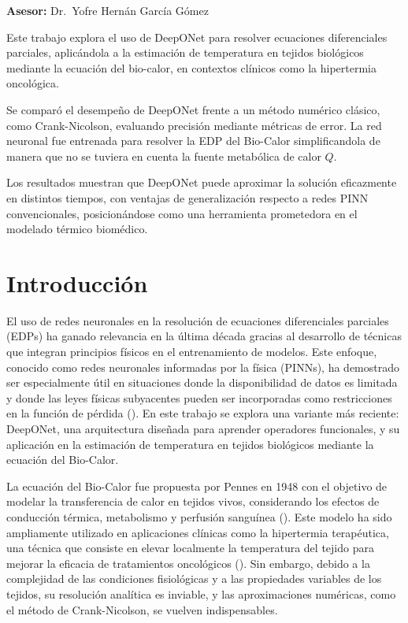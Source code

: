 \documentclass[
  spanish,
  us-letterpaper,
]{scrreprt}
\theoremstyle{plain}
\theoremstyle{definition}
\theoremstyle{remark}
\begin{document}
\textbf{Asesor:} Dr.~Yofre Hernán García Gómez

Este trabajo explora el uso de DeepONet para resolver ecuaciones
diferenciales parciales, aplicándola a la estimación de temperatura en
tejidos biológicos mediante la ecuación del bio-calor, en contextos
clínicos como la hipertermia oncológica.

Se comparó el desempeño de DeepONet frente a un método numérico clásico,
como Crank-Nicolson, evaluando precisión mediante métricas de error. La
red neuronal fue entrenada para resolver la EDP del Bio-Calor
simplificandola de manera que no se tuviera en cuenta la fuente
metabólica de calor \(Q\).

Los resultados muestran que DeepONet puede aproximar la solución
eficazmente en distintos tiempos, con ventajas de generalización
respecto a redes PINN convencionales, posicionándose como una
herramienta prometedora en el modelado térmico biomédico.


\chapter{Introducción}\label{introducciuxf3n}

El uso de redes neuronales en la resolución de ecuaciones diferenciales
parciales (EDPs) ha ganado relevancia en la última década gracias al
desarrollo de técnicas que integran principios físicos en el
entrenamiento de modelos. Este enfoque, conocido como redes neuronales
informadas por la física (PINNs), ha demostrado ser especialmente útil
en situaciones donde la disponibilidad de datos es limitada y donde las
leyes físicas subyacentes pueden ser incorporadas como restricciones en
la función de pérdida (). En este trabajo se explora una variante más
reciente: DeepONet, una arquitectura diseñada para aprender operadores
funcionales, y su aplicación en la estimación de temperatura en tejidos
biológicos mediante la ecuación del Bio-Calor.

La ecuación del Bio-Calor fue propuesta por Pennes en 1948 con el
objetivo de modelar la transferencia de calor en tejidos vivos,
considerando los efectos de conducción térmica, metabolismo y perfusión
sanguínea (). Este modelo ha sido
ampliamente utilizado en aplicaciones clínicas como la hipertermia
terapéutica, una técnica que consiste en elevar localmente la
temperatura del tejido para mejorar la eficacia de tratamientos
oncológicos (). Sin embargo, debido a la complejidad de las condiciones
fisiológicas y a las propiedades variables de los tejidos, su resolución
analítica es inviable, y las aproximaciones numéricas, como el método de
Crank-Nicolson, se vuelven indispensables.
\end{document}
